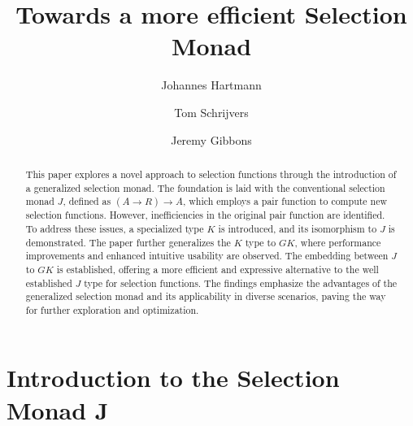 \documentclass[runningheads]{llncs}
\newcommand{\ignore}[1]{}
\begin{document}
\title{Towards a more efficient Selection Monad}

\author{
    Johannes Hartmann \and 
    Tom Schrijvers\and 
    Jeremy Gibbons
}
%


%
\maketitle              %
%
\begin{abstract}
This paper explores a novel approach to selection functions through the
introduction of a generalized selection monad. The foundation is laid
with the conventional selection monad \(J\), defined as
\((A \rightarrow R) \rightarrow A\), which employs a pair function to
compute new selection functions. However, inefficiencies in the original
pair function are identified. To address these issues, a specialized
type \(K\) is introduced, and its isomorphism to \(J\) is demonstrated.
The paper further generalizes the \(K\) type to \(GK\), where
performance improvements and enhanced intuitive usability are observed.
The embedding between \(J\) to \(GK\) is established, offering a more
efficient and expressive alternative to the well established \(J\) type
for selection functions. The findings emphasize the advantages of the
generalized selection monad and its applicability in diverse scenarios,
paving the way for further exploration and optimization.

\end{abstract}
%
%
%
\ignore{

> {-# LANGUAGE ImpredicativeTypes #-}
> {-# LANGUAGE ScopedTypeVariables #-}

> import Prelude hiding ((>>=), return, pure, (<*>), fmap, sequence, pred)
> import Data.Function (on)
> import Data.List
  import GHC.Base (TVar#)
  
}

\section{Introduction to the Selection Monad
J}\label{introduction-to-the-selection-monad-j}
\end{document}
